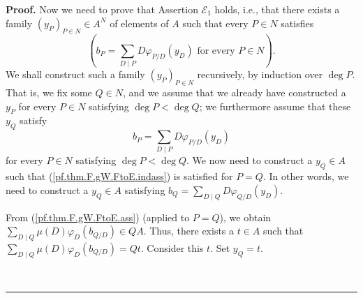 \documentclass[numbers=enddot,12pt,final,onecolumn,notitlepage]{scrartcl}%
\theoremstyle{definition}
\newenvironment{proof}[1][Proof]{\noindent\textbf{#1.} }{\ \rule{0.5em}{0.5em}}
\let\sumnonlimits\sum
\renewcommand{\sum}{\sumnonlimits\limits}
\begin{document}
\begin{proof}
Now we need to prove that Assertion $\mathcal{E}_{1}$ holds, i.e., that there
exists a family $\left(  y_{P}\right)  _{P\in N}\in A^{N}$ of elements of $A$
such that every $P\in N$ satisfies%
\begin{equation}
\left(  b_{P}=\sum_{D\mid P}D\varphi_{P/D}\left(  y_{D}\right)  \text{ for
every }P\in N\right)  . \label{pf.thm.F.gW.FtoE.goal}%
\end{equation}
We shall construct such a family $\left(  y_{P}\right)  _{P\in N}$
recursively, by induction over $\deg P$. That is, we fix some $Q\in N$, and we
assume that we already have constructed a $y_{P}$ for every $P\in N$
satisfying $\deg P<\deg Q$; we furthermore assume that these $y_{Q}$ satisfy%
\begin{equation}
b_{P}=\sum_{D\mid P}D\varphi_{P/D}\left(  y_{D}\right)
\label{pf.thm.F.gW.FtoE.indass}%
\end{equation}
for every $P\in N$ satisfying $\deg P<\deg Q$. We now need to construct a
$y_{Q}\in A$ such that (\ref{pf.thm.F.gW.FtoE.indass}) is satisfied for $P=Q$.
In other words, we need to construct a $y_{Q}\in A$ satisfying $b_{Q}%
=\sum_{D\mid Q}D\varphi_{Q/D}\left(  y_{D}\right)  $.

From (\ref{pf.thm.F.gW.FtoE.ass}) (applied to $P=Q$), we obtain $\sum_{D\mid
Q}\mu\left(  D\right)  \varphi_{D}\left(  b_{Q/D}\right)  \in QA$. Thus, there
exists a $t\in A$ such that $\sum_{D\mid Q}\mu\left(  D\right)  \varphi
_{D}\left(  b_{Q/D}\right)  =Qt$. Consider this $t$. Set $y_{Q}=t$.


\end{proof}
\end{document}

